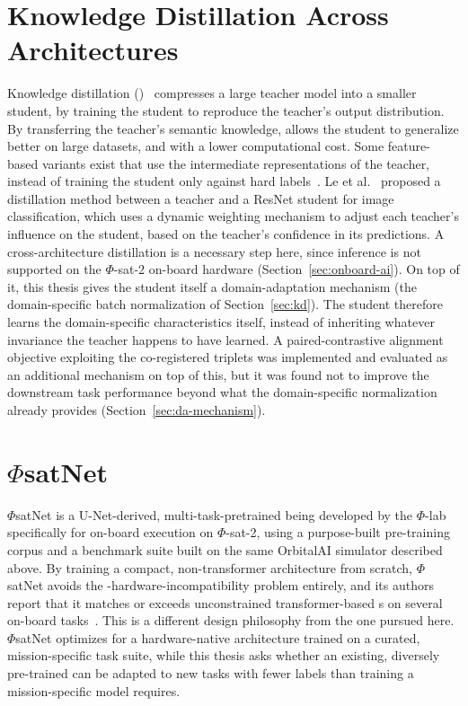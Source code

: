 \section{Knowledge Distillation Across Architectures}

Knowledge distillation ()~\cite{hinton2015distilling} compresses a large teacher model into a smaller student, by training the student to reproduce the teacher's output distribution.
By transferring the teacher's semantic knowledge,  allows the student to generalize better on large datasets, and with a lower computational cost.
Some feature-based variants exist that use the intermediate representations of the teacher, instead of training the student only against hard labels~\cite{heo2019comprehensive}.
Le et al.~\cite{le2025semantic} proposed a distillation method between a  teacher and a ResNet student for image classification, which uses a dynamic weighting mechanism to adjust each teacher's influence on the student, based on the teacher's confidence in its predictions.
A cross-architecture distillation is a necessary step here, since  inference is not supported on the $\Phi$-sat-2 on-board hardware (Section~\ref{sec:onboard-ai}).
On top of it, this thesis gives the student itself a domain-adaptation mechanism (the domain-specific batch normalization of Section~\ref{sec:kd}).
The student therefore learns the domain-specific characteristics itself, instead of inheriting whatever invariance the teacher happens to have learned.
A paired-contrastive alignment objective exploiting the co-registered triplets was implemented and evaluated as an additional mechanism on top of this, but it was found not to improve the downstream task performance beyond what the domain-specific normalization already provides (Section~\ref{sec:da-mechanism}).

\section{$\Phi$satNet}
\label{sec:phisatnet-background}

$\Phi$satNet is a U-Net-derived, multi-task-pretrained  being developed by the $\Phi$-lab specifically for on-board execution on $\Phi$-sat-2, using a purpose-built pre-training corpus and a benchmark suite built on the same OrbitalAI simulator described above.
By training a compact, non-transformer architecture from scratch, $\Phi$satNet avoids the -hardware-incompatibility problem entirely, and its authors report that it matches or exceeds unconstrained transformer-based s on several on-board tasks~\cite{phisatnet}.
This is a different design philosophy from the one pursued here.
$\Phi$satNet optimizes for a hardware-native architecture trained on a curated, mission-specific task suite, while this thesis asks whether an existing, diversely pre-trained  can be adapted to new tasks with fewer labels than training a mission-specific model requires.

